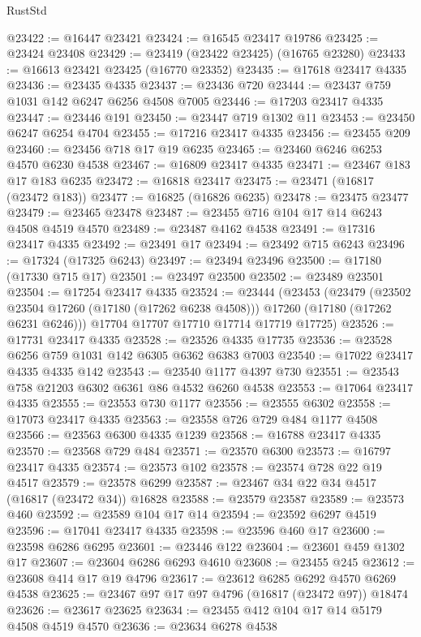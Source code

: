 \begin{lexlean}{RustStd}
\begin{coremodule}
{\begin{coremodule}
{{{{{{{{{{{{{{{{{{{{{{{{{{{{{{{{{{{{{{{{{{{{{{{{{{{{{{{@23422 := @16447 @23421
@23424 := @16545 @23417 @19786
@23425 := @23424 @23408
@23429 := @23419 (@23422 @23425) (@16765 @23280)
@23433 := @16613 @23421 @23425 (@16770 @23352)
@23435 := @17618 @23417 @4335
@23436 := @23435 @4335
@23437 := @23436 @720
@23444 := @23437 @759 @1031 @142 @6247 @6256 @4508 @7005
@23446 := @17203 @23417 @4335
@23447 := @23446 @191
@23450 := @23447 @719 @1302 @11
@23453 := @23450 @6247 @6254 @4704
@23455 := @17216 @23417 @4335
@23456 := @23455 @209
@23460 := @23456 @718 @17 @19 @6235
@23465 := @23460 @6246 @6253 @4570 @6230 @4538
@23467 := @16809 @23417 @4335
@23471 := @23467 @183 @17 @183 @6235
@23472 := @16818 @23417
@23475 := @23471 (@16817 (@23472 @183))
@23477 := @16825 (@16826 @6235)
@23478 := @23475 @23477
@23479 := @23465 @23478
@23487 := @23455 @716 @104 @17 @14 @6243 @4508 @4519 @4570
@23489 := @23487 @4162 @4538
@23491 := @17316 @23417 @4335
@23492 := @23491 @17
@23494 := @23492 @715 @6243
@23496 := @17324 (@17325 @6243)
@23497 := @23494 @23496
@23500 := @17180 (@17330 @715 @17)
@23501 := @23497 @23500
@23502 := @23489 @23501
@23504 := @17254 @23417 @4335
@23524 := @23444
    (@23453
      (@23479
        (@23502 @23504 @17260 (@17180 (@17262 @6238 @4508)))
        @17260
        (@17180 (@17262 @6231 @6246)))
      @17704
      @17707
      @17710
      @17714
      @17719
      @17725)
@23526 := @17731 @23417 @4335
@23528 := @23526 @4335 @17735
@23536 := @23528 @6256 @759 @1031 @142 @6305 @6362 @6383 @7003
@23540 := @17022 @23417 @4335 @4335 @142
@23543 := @23540 @1177 @4397 @730
@23551 := @23543 @758 @21203 @6302 @6361 @86 @4532 @6260 @4538
@23553 := @17064 @23417 @4335
@23555 := @23553 @730 @1177
@23556 := @23555 @6302
@23558 := @17073 @23417 @4335
@23563 := @23558 @726 @729 @484 @1177 @4508
@23566 := @23563 @6300 @4335 @1239
@23568 := @16788 @23417 @4335
@23570 := @23568 @729 @484
@23571 := @23570 @6300
@23573 := @16797 @23417 @4335
@23574 := @23573 @102
@23578 := @23574 @728 @22 @19 @4517
@23579 := @23578 @6299
@23587 := @23467 @34 @22 @34 @4517 (@16817 (@23472 @34)) @16828
@23588 := @23579 @23587
@23589 := @23573 @460
@23592 := @23589 @104 @17 @14
@23594 := @23592 @6297 @4519
@23596 := @17041 @23417 @4335
@23598 := @23596 @460 @17
@23600 := @23598 @6286 @6295
@23601 := @23446 @122
@23604 := @23601 @459 @1302 @17
@23607 := @23604 @6286 @6293 @4610
@23608 := @23455 @245
@23612 := @23608 @414 @17 @19 @4796
@23617 := @23612 @6285 @6292 @4570 @6269 @4538
@23625 := @23467 @97 @17 @97 @4796 (@16817 (@23472 @97)) @18474
@23626 := @23617 @23625
@23634 := @23455 @412 @104 @17 @14 @5179 @4508 @4519 @4570
@23636 := @23634 @6278 @4538
}}}}}}}}}}}}}}}}}}}}}}}}}}}}}}}}}}}}}}}}}}}}}}}}}}}}}}}
\end{coremodule}}
\end{coremodule}
\end{lexlean}
